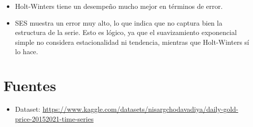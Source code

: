 \documentclass[
]{book}
\providecommand{\tightlist}{%
  \setlength{\itemsep}{0pt}\setlength{\parskip}{0pt}}
\begin{document}
\begin{itemize}
\tightlist
\item
  Holt-Winters tiene un desempeño mucho mejor en términos de error.
\item
  SES muestra un error muy alto, lo que indica que no captura bien la estructura de la serie. Esto es lógico, ya que el suavizamiento exponencial simple no considera estacionalidad ni tendencia, mientras que Holt-Winters sí lo hace.
\end{itemize}

\chapter{Fuentes}\label{fuentes}

\begin{itemize}
\tightlist
\item
  Dataset: \url{https://www.kaggle.com/datasets/nisargchodavadiya/daily-gold-price-20152021-time-series}
\end{itemize}

  
\end{document}
